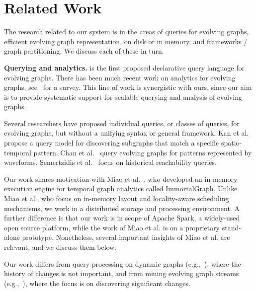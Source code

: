 \section{Related Work}
\label{sec:related}

The research related to our \ql system is in the areas of queries for
evolving graphs, efficient evolving graph representation, on disk or
in memory, and frameworks / graph partitioning.  We discuss each of
these in turn.

{\bf Querying and analytics.} \ql is the first proposed declarative
query language for evolving graphs.  There has been much recent work
on analytics for evolving graphs,
see~\cite{DBLP:journals/csur/AggarwalS14} for a survey. This line of
work is synergistic with ours, since our aim is to provide systematic
support for scalable querying and analysis of evolving graphs.

Several researchers have proposed individual queries, or classes of
queries, for evolving graphs, but without a unifying syntax or general
framework.  Kan et al.~\cite{Kan2009} propose a query model for
discovering subgraphs that match a specific spatio-temporal pattern.
Chan et al.~\cite{Chan2008} query evolving graphs for patterns
represented by waveforms.  Semertzidis et al.~\cite{Semertzidis2015}
focus on historical reachability queries.

Our work shares motivation with Miao et
al.~\cite{DBLP:journals/tos/MiaoHLWYZPCC15}, who developed an
in-memory execution engine for temporal graph analytics called
ImmortalGraph.  Unlike Miao et al., who focus on in-memory layout and
locality-aware scheduling mechanisms, we work in a distributed storage
and processing environment.  A further difference is that our work is
in scope of Apache Spark, a widely-used open source platform, while
the work of Miao et al. is on a proprietary stand-alone prototype.
Nonetheless, several important insights of Miao et al. are relevant,
and we discuss them below.


Our work differs from query processing on dynamic graphs
(e.g.,~\cite{Mondal2012}), where the history of changes is not
important, and from mining evolving graph streams
(e.g.,~\cite{Liu2010}), where the focus is on discovering significant
changes.

